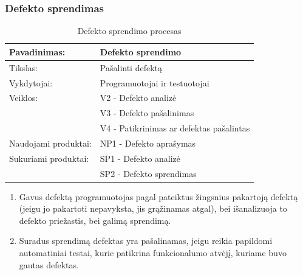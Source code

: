 \documentclass{VUMIFPSkursinis}
\begin{document}
	\subsubsection{Defekto sprendimas}
	\begin{center}
		\begin{table}[ht]
		\caption{Defekto sprendimo procesas}
		\begin{tabular}{ | l | l | } 
		\hline
		Pavadinimas:         & Defekto sprendimo                               \\ \hline
		Tikslas: 	           & Pašalinti defektą\\ \hline
		Vykdytojai:          & Programuotojai ir testuotojai                                \\ \hline
		Veiklos:             & V2 - Defekto analizė \\ 
									  & V3 - Defekto pašalinimas 																			 \\ 
									  & V4 - Patikrinimas ar defektas pašalintas \\ \hline
		Naudojami produktai: & NP1 - Defekto aprašymas																											 \\ \hline
		Sukuriami produktai: & SP1 - Defekto analizė																											\\ 
												& SP2 - Defekto sprendimas \\ \hline
		\end{tabular}
	\end{table}
		\end{center}
		\begin{enumerate}
			\item Gavus defektą programuotojas pagal pateiktus žingsnius pakartoją defektą (jeigu jo pakartoti nepavyksta, jis grąžinamas atgal), bei išanalizuoja to defekto priežastis, bei galimą sprendimą.
			\item Suradus sprendimą defektas yra pašalinamas, jeigu reikia papildomi automatiniai testai, kurie patikrina funkcionalumo atvėjį, kuriame buvo gautas defektas.
		\end{enumerate}
\end{document}
